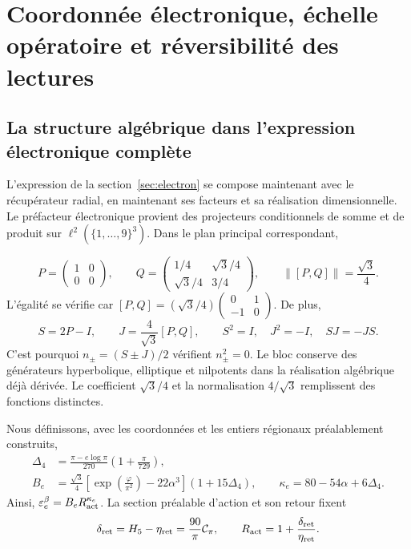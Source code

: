 \section{Coordonnée électronique, échelle opératoire et réversibilité des lectures}
\label{rec:recuperacion}

\subsection{La structure algébrique dans l’expression électronique complète}

L’expression de la section~\ref{sec:electron} se compose maintenant avec le récupérateur radial, en maintenant ses facteurs et sa réalisation dimensionnelle. Le préfacteur électronique provient des projecteurs conditionnels de somme et de produit sur \(\ell^2(\{1,\ldots,9\}^3)\). Dans le plan principal correspondant,

\[
 P=\begin{pmatrix}1&0\\0&0\end{pmatrix},\qquad
 Q=\begin{pmatrix}1/4&\sqrt3/4\\\sqrt3/4&3/4\end{pmatrix},
 \qquad\|[P,Q]\|=\frac{\sqrt3}{4}.
\]
L'égalité se vérifie car \([P,Q]=(\sqrt3/4)\left(\begin{smallmatrix}0&1\\-1&0\end{smallmatrix}\right)\).
De plus,
\[
 S=2P-I,\qquad J=\frac4{\sqrt3}[P,Q],\qquad
 S^2=I,\quad J^2=-I,\quad SJ=-JS.
\]
C’est pourquoi \(n_\pm=(S\pm J)/2\) vérifient \(n_\pm^2=0\). Le bloc conserve des générateurs hyperbolique, elliptique et nilpotents dans la réalisation algébrique déjà dérivée. Le coefficient \(\sqrt3/4\) et la normalisation \(4/\sqrt3\) remplissent des fonctions distinctes.

Nous définissons, avec les coordonnées et les entiers régionaux préalablement construits,
\begin{align}
 \Delta_4&=\frac{\pi-e\log\pi}{270}\left(1+\frac\pi{729}\right),\nonumber\\
 B_e&=\frac{\sqrt3}{4}
       \left[\exp\!\left(\frac\varphi{\pi^2}\right)-22\alpha^3\right]
       (1+15\Delta_4),\qquad
 \kappa_e=80-54\alpha+6\Delta_4.
 \label{rec:eq:electron-basal}
\end{align}
Ainsi, \(\varepsilon_e^{\beta}=B_eR_{\rm act}^{\kappa_e}\). La section préalable d'action et son retour fixent
\[
 \delta_{\rm ret}=H_5-\eta_{\rm ret}=\frac{90}{\pi}\mathcal C_\pi,
 \qquad R_{\rm act}=1+\frac{\delta_{\rm ret}}{\eta_{\rm ret}}.
\]

